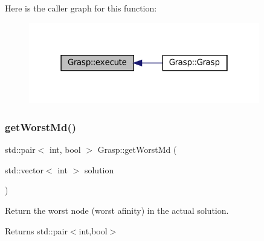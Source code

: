 Here is the caller graph for this function\+:\nopagebreak
\begin{figure}[H]
\begin{center}
\leavevmode
\includegraphics[width=286pt]{classGrasp_a335b063bccd26b434dda3a3a69d6d711_icgraph}
\end{center}
\end{figure}
\mbox{\label{classGrasp_a858a5aee4066bf5ef7946e8ea3e10bcf}} 
\subsubsection{\texorpdfstring{get\+Worst\+Md()}{getWorstMd()}}
{\footnotesize\ttfamily std\+::pair$<$ int, bool $>$ Grasp\+::get\+Worst\+Md (\begin{DoxyParamCaption}\item[{std\+::vector$<$ int $>$}]{solution }\end{DoxyParamCaption})}



Return the worst node (worst afinity) in the actual solution. 

\begin{DoxyReturn}{Returns}
std\+::pair$<$int,bool$>$ 
\end{DoxyReturn}

